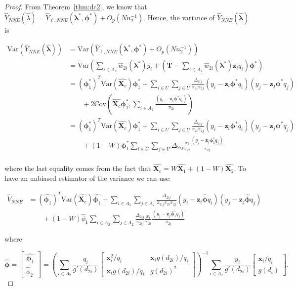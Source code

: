 \documentclass[12pt]{article}
\newcommand{\Cov}{{\text{Cov}}}
\newcommand{\Var}{{\text{Var}}}
\renewcommand{\bf}[1]{\mathbf{#1}}
\begin{document}
\begin{proof}
  From Theorem~\ref{thm:dc2}, we know that $\hat Y_{NNE}(\hat \lambda) = 
  \hat Y_{\ell, NNE}(\bm \lambda^*, \bm \phi^*) + O_p(Nn_2^{-1})$. Hence, the
  variance of $\hat Y_{NNE}(\hat{\bm \lambda})$ is 

  \begin{align*}
    \Var(\hat Y_{NNE}(\hat{\bm \lambda})) 
    &= \Var(\hat Y_{\ell, NNE}(\bm \lambda^*, \bm \phi^*) + O_p(Nn_2^{-1})) \\ 
    &= \Var\left(\sum_{i \in A_2} \hat w_{2i}(\bm \lambda^*) y_i + 
      \left(\bf T - \sum_{i \in A_2} \hat w_{2i}(\bm \lambda^*) \bf z_i
    q_i\right)\bm \phi^*\right)\\
    &= (\bm \phi_1^*)^T \Var(\hat{\bf X_c}) \bm \phi_1^* + 
    \sum_{i \in U} \sum_{j \in U} \frac{\Delta_{2ij}}{\pi_{2i}\pi_{2j}} 
    (y_i - \bf z_i \bm \phi^* q_i)(y_j - \bf z_j \bm \phi^* q_j)\\
    &\qquad+ 2 \Cov\left(\hat{\bf X_c} \bm \phi_1^*, \sum_{i \in A_2} 
      \frac{(y_i - \bf z_i \bm \phi^* q_i)}{\pi_{2i}}\right) \\
    &= (\bm \phi_1^*)^T \Var(\hat{\bf X_c}) \bm \phi_1^* + 
    \sum_{i \in U} \sum_{j \in U} \frac{\Delta_{2ij}}{\pi_{2i}\pi_{2j}} 
    (y_i - \bf z_i \bm \phi^* q_i)(y_j - \bf z_j \bm \phi^* q_j)\\
    &\qquad + (1 - W)\bm \phi_1^* \sum_{i \in U} \sum_{j \in U} \Delta_{2ij} 
    \frac{x_i}{\pi_{2i}} \frac{(y_j - \bf z_j \bm \phi^*_1 q_j)}{\pi_{2j}}\\
  \end{align*}

  where the last equality comes from the fact that $\hat{\bf X_c} = W\hat{\bf
  X_1} + (1 - W) \hat{\bf X_2}$. To have an unbiased estimator of the variance
  we can use:

  \begin{align*}
    \hat V_{NNE} 
    &= (\hat{\bm \phi_1})^T \Var(\hat{\bf X_c}) \hat{\bm \phi_1} + 
    \sum_{i \in A_2} \sum_{j \in A_2} \frac{\Delta_{2ij}}{\pi_{2ij}\pi_{2i}\pi_{2j}} 
    (y_i - \bf z_i \hat{\bm \phi} q_i)(y_j - \bf z_j \hat{\bm \phi} q_j) \\
    &\qquad + (1 - W)\hat \phi_1 \sum_{i \in A_2} \sum_{j \in A_2} 
    \frac{\Delta_{2ij}}{\pi_{2ij}} \frac{x_i}{\pi_{2i}} 
    \frac{(y_j - \bf z_j \hat{\bm \phi_1} q_j)}{\pi_{2j}}
  \end{align*}

  where 
  
  $$\hat{\bm \phi} =
  \begin{bmatrix}
    \hat{\bm \phi_1} \\ \hat \phi_2
  \end{bmatrix} = 
  \left(\sum_{i \in A_2} \frac{q_i}{g'(d_{2i})} 
  \begin{bmatrix}
    \bf x_i^2 / q_i & \bf x_i g(d_{2i}) / q_i \\
    \bf x_i g(d_{2i}) / q_i & g(d_{2i})^2
  \end{bmatrix}
  \right)^{-1}
  \sum_{i \in A_2} \frac{y_i}{g'(d_{2i})} 
  \begin{bmatrix} \bf x_i / q_i \\ g(d_i) \end{bmatrix}.
  $$


\end{proof}
\end{document}
